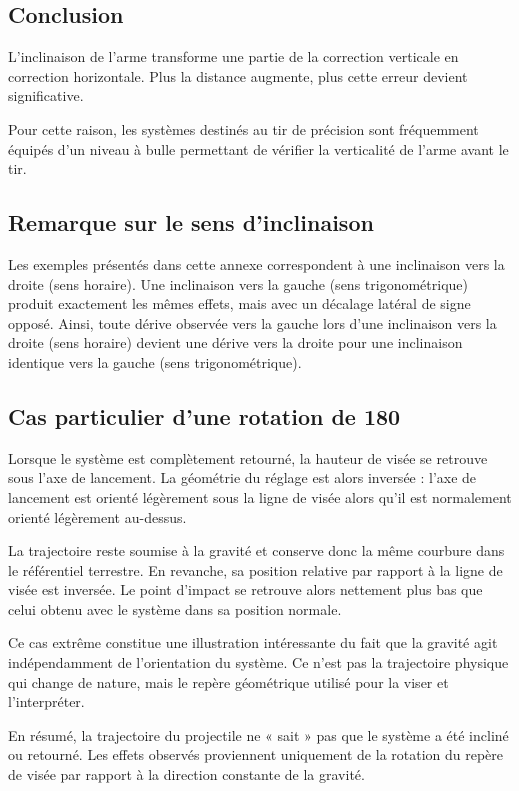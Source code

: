 \subsection{Conclusion}

L'inclinaison de l'arme transforme une partie de la correction verticale en correction horizontale. Plus la distance augmente, plus cette erreur devient significative.

Pour cette raison, les systèmes destinés au tir de précision sont fréquemment équipés d'un niveau à bulle permettant de vérifier la verticalité de l'arme avant le tir.

\subsection{Remarque sur le sens d'inclinaison}

Les exemples présentés dans cette annexe correspondent à une inclinaison vers la droite (sens horaire). Une inclinaison vers la gauche (sens trigonométrique) produit exactement les mêmes effets, mais avec un décalage latéral de signe opposé. Ainsi, toute dérive observée vers la gauche lors d'une inclinaison vers la droite (sens horaire) devient une dérive vers la droite pour une inclinaison identique vers la gauche (sens trigonométrique).

\subsection{Cas particulier d'une rotation de 180\textdegree}

Lorsque le système est complètement retourné, la hauteur de visée se retrouve sous l'axe de lancement. La géométrie du réglage est alors inversée : l'axe de lancement est orienté légèrement sous la ligne de visée alors qu'il est normalement orienté légèrement au-dessus.

La trajectoire reste soumise à la gravité et conserve donc la même courbure dans le référentiel terrestre. En revanche, sa position relative par rapport à la ligne de visée est inversée. Le point d'impact se retrouve alors nettement plus bas que celui obtenu avec le système dans sa position normale.

Ce cas extrême constitue une illustration intéressante du fait que la gravité agit indépendamment de l'orientation du système. Ce n'est pas la trajectoire physique qui change de nature, mais le repère géométrique utilisé pour la viser et l'interpréter.

En résumé, la trajectoire du projectile ne « sait » pas que le système a été incliné ou retourné. Les effets observés proviennent uniquement de la rotation du repère de visée par rapport à la direction constante de la gravité.

